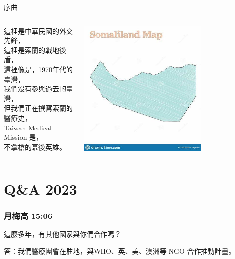 \documentclass[aspectratio=169]{beamer}
\begin{document}
\begin{frame}{序曲}

\begin{columns}
    \begin{outline}
        這裡是中華民國的外交先鋒，\\
        這裡是索蘭的戰地後盾，\\
        這裡像是，1970年代的臺灣，\\
        我們沒有參與過去的臺灣，\\
        但我們正在撰寫索蘭的醫療史，\\
        Taiwan Medical Mission 是，\\
        不拿槍的幕後英雄。\\
    \end{outline}

\includegraphics[width=0.7\textwidth]{Somaliland.jpeg}
\end{columns}

\end{frame}




\section{Q\&A 2023}


\begin{frame}
\frametitle{月梅高 15:06}
這麼多年，有其他國家與你們合作嗎？

答：我們醫療團會在駐地，與WHO、英、美、澳洲等 NGO 合作推動計畫。
\end{frame}
\end{document}
